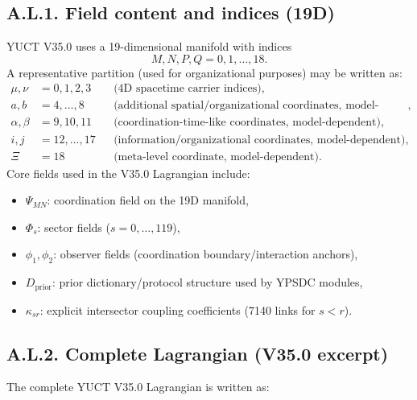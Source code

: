 \documentclass[13pt,a4paper]{article}
\newcommand{\Dprior}{D_{\mathrm{prior}}}
\begin{document}
	\subsection*{A.L.1. Field content and indices (19D)}
	YUCT V35.0 uses a 19-dimensional manifold with indices
	\[
	M,N,P,Q=0,1,\dots,18.
	\]
	A representative partition (used for organizational purposes) may be written as:
	\begin{align*}
		\mu,\nu &= 0,1,2,3 &&\text{(4D spacetime carrier indices)},\\
		a,b &= 4,\dots,8 &&\text{(additional spatial/organizational coordinates, model-dependent)},\\
		\alpha,\beta &= 9,10,11 &&\text{(coordination-time-like coordinates, model-dependent)},\\
		i,j &= 12,\dots,17 &&\text{(information/organizational coordinates, model-dependent)},\\
		\Xi &= 18 &&\text{(meta-level coordinate, model-dependent)}.
	\end{align*}
	Core fields used in the V35.0 Lagrangian include:
	\begin{itemize}[leftmargin=*]
		\item $\Psi_{MN}$: coordination field on the 19D manifold,
		\item $\Phi_s$: sector fields ($s=0,\dots,119$),
		\item $\phi_1,\phi_2$: observer fields (coordination boundary/interaction anchors),
		\item $\Dprior$: prior dictionary/protocol structure used by YPSDC modules,
		\item $\kappa_{sr}$: explicit intersector coupling coefficients (7140 links for $s<r$).
	\end{itemize}
	
	\subsection*{A.L.2. Complete Lagrangian (V35.0 excerpt)}
	The complete YUCT V35.0 Lagrangian is written as:
	
\end{document}
